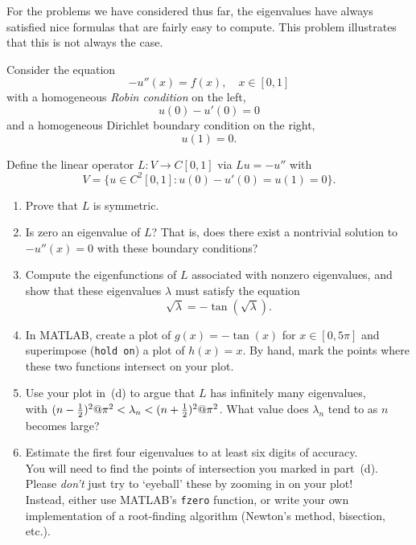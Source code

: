 For the problems we have considered thus far, the eigenvalues have always
satisfied nice formulas that are fairly easy to compute.  This problem 
illustrates that this is not always the case.  

Consider the equation
\[ -u''(x) = f(x), \quad x\in[0,1] \]
with a homogeneous \emph{Robin condition} on the left,
\[ u(0) - u'(0) = 0\]
and a homogeneous Dirichlet boundary condition on the right,
\[ u(1) = 0.\]

Define the linear operator $L: V\to C[0,1]$ via $Lu = -u''$ with
\[ V = \{u\in C^2[0,1]:  u(0)-u'(0)=u(1)=0\}.\]

\begin{enumerate}
\item Prove that $L$ is symmetric.

\vspace*{1em}
\item Is zero an eigenvalue of $L$?  That is, does there exist a 
      nontrivial solution to $-u''(x) = 0$ with these boundary conditions?

\vspace*{1em}
\item Compute the eigenfunctions of $L$ associated with nonzero eigenvalues, 
      and show that these eigenvalues 
      $\lambda$ must satisfy the equation
      \[ \sqrt{\lambda} = - \tan(\sqrt{\lambda}).\]

\vspace*{1em}
\item In MATLAB, create a plot of $g(x) = -\tan(x)$ for $x\in [0, 5\pi]$ 
      and superimpose (\verb|hold on|) a plot of $h(x)=x$.
      By hand, mark the points where these two functions intersect on your plot.

\vspace*{1em}
\item Use your plot in~(d) to argue that $L$ has infinitely many eigenvalues, \\
      with $(n-{1\over 2})^2@\pi^2 < \lambda_n < (n+{1\over2})^2@\pi^2$.
      What value does $\lambda_n$ tend to as $n$ becomes large?

\vspace*{1em}
\item Estimate the first four eigenvalues to at least six digits of accuracy.\\
      You will need to find the points of intersection you marked in part~(d).\\
      Please \emph{don't} just try to `eyeball' these by zooming in on your plot!\\
      Instead, either use MATLAB's \verb|fzero| function, or write your
      own implementation of a root-finding algorithm (Newton's method, 
      bisection, etc.).


\end{enumerate}
